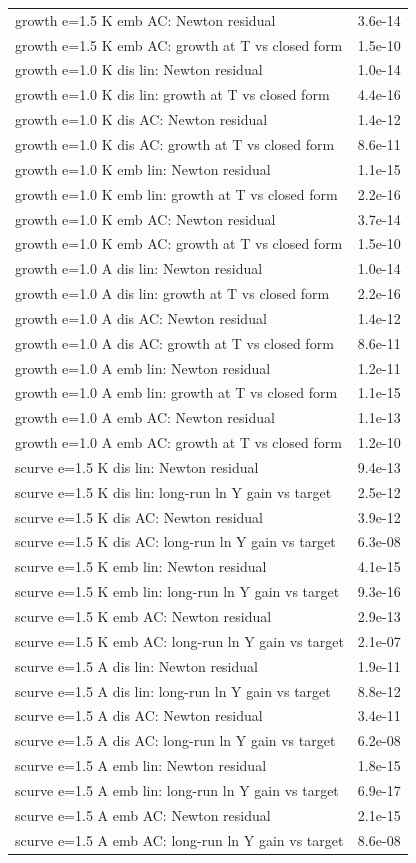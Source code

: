 \begin{tabular}{lc}
growth e=1.5 K emb AC: Newton residual & 3.6e-14\\
growth e=1.5 K emb AC: growth at T vs closed form & 1.5e-10\\
growth e=1.0 K dis lin: Newton residual & 1.0e-14\\
growth e=1.0 K dis lin: growth at T vs closed form & 4.4e-16\\
growth e=1.0 K dis AC: Newton residual & 1.4e-12\\
growth e=1.0 K dis AC: growth at T vs closed form & 8.6e-11\\
growth e=1.0 K emb lin: Newton residual & 1.1e-15\\
growth e=1.0 K emb lin: growth at T vs closed form & 2.2e-16\\
growth e=1.0 K emb AC: Newton residual & 3.7e-14\\
growth e=1.0 K emb AC: growth at T vs closed form & 1.5e-10\\
growth e=1.0 A dis lin: Newton residual & 1.0e-14\\
growth e=1.0 A dis lin: growth at T vs closed form & 2.2e-16\\
growth e=1.0 A dis AC: Newton residual & 1.4e-12\\
growth e=1.0 A dis AC: growth at T vs closed form & 8.6e-11\\
growth e=1.0 A emb lin: Newton residual & 1.2e-11\\
growth e=1.0 A emb lin: growth at T vs closed form & 1.1e-15\\
growth e=1.0 A emb AC: Newton residual & 1.1e-13\\
growth e=1.0 A emb AC: growth at T vs closed form & 1.2e-10\\
scurve e=1.5 K dis lin: Newton residual & 9.4e-13\\
scurve e=1.5 K dis lin: long-run ln Y gain vs target & 2.5e-12\\
scurve e=1.5 K dis AC: Newton residual & 3.9e-12\\
scurve e=1.5 K dis AC: long-run ln Y gain vs target & 6.3e-08\\
scurve e=1.5 K emb lin: Newton residual & 4.1e-15\\
scurve e=1.5 K emb lin: long-run ln Y gain vs target & 9.3e-16\\
scurve e=1.5 K emb AC: Newton residual & 2.9e-13\\
scurve e=1.5 K emb AC: long-run ln Y gain vs target & 2.1e-07\\
scurve e=1.5 A dis lin: Newton residual & 1.9e-11\\
scurve e=1.5 A dis lin: long-run ln Y gain vs target & 8.8e-12\\
scurve e=1.5 A dis AC: Newton residual & 3.4e-11\\
scurve e=1.5 A dis AC: long-run ln Y gain vs target & 6.2e-08\\
scurve e=1.5 A emb lin: Newton residual & 1.8e-15\\
scurve e=1.5 A emb lin: long-run ln Y gain vs target & 6.9e-17\\
scurve e=1.5 A emb AC: Newton residual & 2.1e-15\\
scurve e=1.5 A emb AC: long-run ln Y gain vs target & 8.6e-08\\
\bottomrule\end{tabular}

